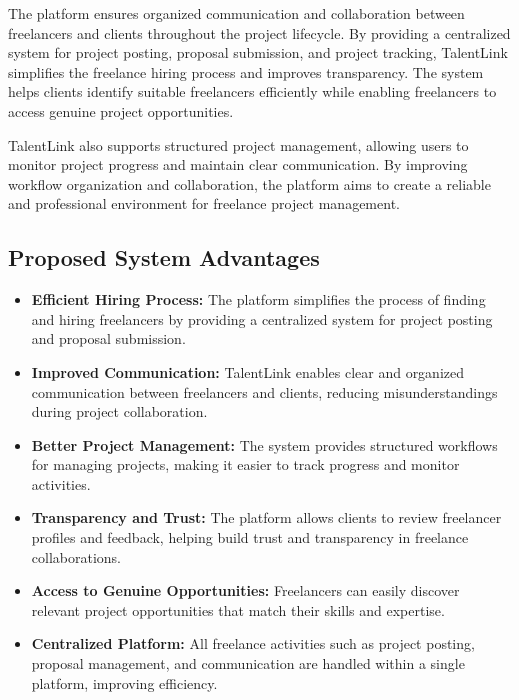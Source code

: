 \documentclass[12pt,a4paper,oneside]{report}
\numberwithin{figure}{chapter}
\numberwithin{table}{chapter}
\begin{document}
\indent The platform ensures organized communication and collaboration between freelancers
and clients throughout the project lifecycle. By providing a centralized system for
project posting, proposal submission, and project tracking, TalentLink simplifies the
freelance hiring process and improves transparency. The system helps clients identify
suitable freelancers efficiently while enabling freelancers to access genuine project
opportunities.

\indent TalentLink also supports structured project management, allowing users to monitor
project progress and maintain clear communication. By improving workflow organization and
collaboration, the platform aims to create a reliable and professional environment for
freelance project management.

\subsection{Proposed System Advantages}

\begin{itemize}[leftmargin=2em]
  \item \textbf{Efficient Hiring Process:} The platform simplifies the process of finding
        and hiring freelancers by providing a centralized system for project posting and
        proposal submission.
  \item \textbf{Improved Communication:} TalentLink enables clear and organized
        communication between freelancers and clients, reducing misunderstandings during
        project collaboration.
  \item \textbf{Better Project Management:} The system provides structured workflows for
        managing projects, making it easier to track progress and monitor activities.
  \item \textbf{Transparency and Trust:} The platform allows clients to review freelancer
        profiles and feedback, helping build trust and transparency in freelance
        collaborations.
  \item \textbf{Access to Genuine Opportunities:} Freelancers can easily discover relevant
        project opportunities that match their skills and expertise.
  \item \textbf{Centralized Platform:} All freelance activities such as project posting,
        proposal management, and communication are handled within a single platform,
        improving efficiency.
\end{itemize}
\end{document}
